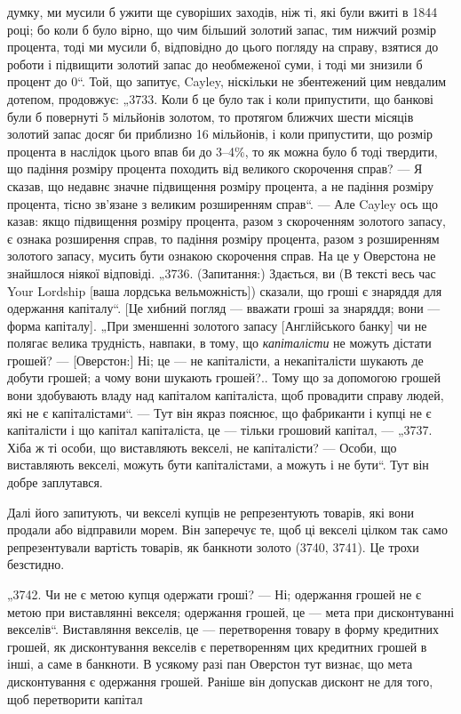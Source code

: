 \parcont{}  %
думку, ми мусили б ужити ще суворіших заходів, ніж ті, які
були вжиті в 1844 році; бо коли б було вірно, що чим більший
золотий запас, тим нижчий розмір процента, тоді ми мусили б,
відповідно до цього погляду на справу, взятися до роботи і підвищити золотий запас до необмеженої
суми, і тоді ми знизили б
процент до 0“. Той, що запитує, Cayley, ніскільки не збентежений цим невдалим дотепом, продовжує:
„3733. Коли б це
було так і коли припустити, що банкові були б повернуті
5 мільйонів золотом, то протягом ближчих шести місяців золотий запас досяг би приблизно 16
мільйонів, і коли припустити,
що розмір процента в наслідок цього впав би до 3--4\%, то
як можна було б тоді твердити, що падіння розміру процента
походить від великого скорочення справ? — Я сказав, що недавнє значне підвищення розміру процента, а
не падіння розміру
процента, тісно зв’язане з великим розширенням справ“. — Але
Cayley ось що казав: якщо підвищення розміру процента, разом з скороченням золотого запасу, є ознака
розширення справ,
то падіння розміру процента, разом з розширенням золотого
запасу, мусить бути ознакою скорочення справ. На це у
Оверстона не знайшлося ніякої відповіді. „3736. (Запитання:)
Здається, ви (В тексті весь час Your Lordship [ваша лордська
вельможність]) сказали, що гроші є знаряддя для одержання
капіталу“. [Це хибний погляд — вважати гроші за знаряддя; вони — форма капіталу]. „При зменшенні
золотого запасу [Англійського банку] чи не полягає велика трудність, навпаки, в тому,
що \emph{капіталісти} не можуть дістати грошей? — [Оверстон:]
Ні; це — не капіталісти, а некапіталісти шукають де добути
грошей; а чому вони шукають грошей?.. Тому що за допомогою
грошей вони здобувають владу над капіталом капіталіста, щоб
провадити справу людей, які не є капіталістами“. — Тут він
якраз пояснює, що фабриканти і купці не є капіталісти і що
капітал капіталіста, це — тільки грошовий капітал, — „3737. Хіба ж
ті особи, що виставляють векселі, не капіталісти? — Особи,
що виставляють векселі, можуть бути капіталістами, а можуть
і не бути“. Тут він добре заплутався.

Далі його запитують, чи векселі купців не репрезентують
товарів, які вони продали або відправили морем. Він заперечує те, щоб ці векселі цілком так само
репрезентували
вартість товарів, як банкноти золото (3740, 3741). Це трохи
безстидно.

„3742. Чи не є метою купця одержати гроші? — Ні; одержання грошей не є метою при виставлянні
векселя; одержання
грошей, це — мета при дисконтуванні векселів“. Виставляння
векселів, це — перетворення товару в форму кредитних грошей,
як дисконтування векселів є перетворенням цих кредитних грошей в інші, а саме в банкноти. В усякому
разі пан Оверстон тут
визнає, що мета дисконтування є одержання грошей. Раніше
він допускав дисконт не для того, щоб перетворити капітал
\parbreak{}  %
